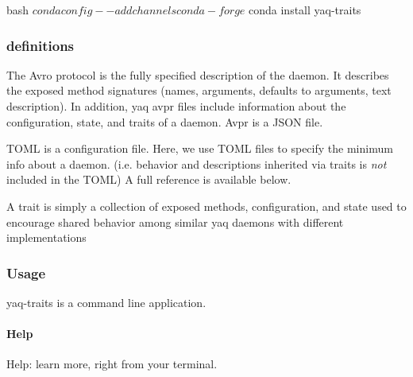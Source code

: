 \begin{codefragment}{bash}
$ conda config --add channels conda-forge
$ conda install yaq-traits
\end{codefragment}

\hypertarget{definitions}{%
\subsubsection{definitions}\label{definitions}}

\begin{description}
\tightlist
\item[\href{https://avro.apache.org/docs/current/spec.html\#Protocol+Declaration}{Avro
Protocol (AVPR)}]
The Avro protocol is the fully specified description of the daemon. It
describes the exposed method signatures (names, arguments, defaults to
arguments, text description). In addition, yaq avpr files include
information about the configuration, state, and traits of a daemon. Avpr
is a JSON file.
\item[\href{https://github.com/toml-lang/toml}{TOML}]
TOML is a configuration file. Here, we use TOML files to specify the
minimum info about a daemon. (i.e. behavior and descriptions inherited
via traits is \emph{not} included in the TOML) A full reference is
available below.
\item[\href{https://yaq.fyi/traits/}{Trait}]
A trait is simply a collection of exposed methods, configuration, and
state used to encourage shared behavior among similar yaq daemons with
different implementations
\end{description}

\hypertarget{usage}{%
\subsubsection{Usage}\label{usage}}

yaq-traits is a command line application.

\hypertarget{help}{%
\paragraph{Help}\label{help}}

Help: learn more, right from your terminal.



